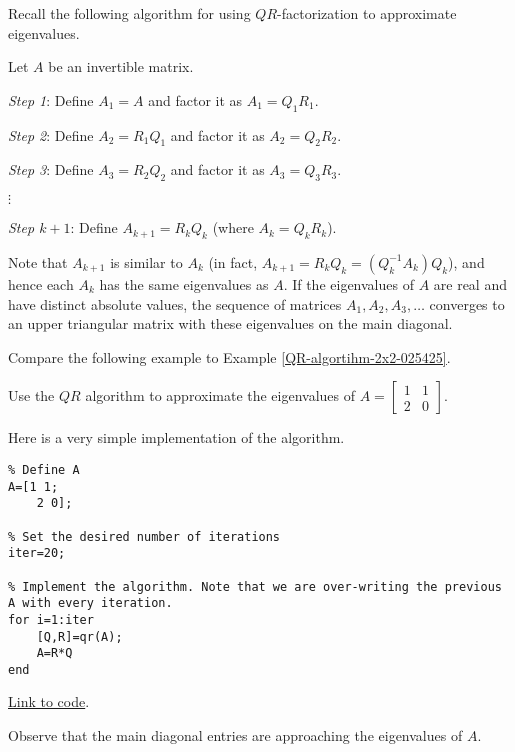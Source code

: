\documentclass{ximera}
\begin{document}
Recall the following algorithm for using $QR$-factorization to approximate eigenvalues.

\begin{algorithm}[\ref{alg:qrEig}]
Let $A$ be an invertible matrix.

\emph{Step 1}: Define $A_{1} = A$ and factor it as $A_{1} = Q_{1}R_{1}$.

\emph{Step 2}: Define $A_{2} = R_{1}Q_{1}$ and factor it as $A_{2} = Q_{2}R_{2}$.

\emph{Step 3}: Define $A_{3} = R_{2}Q_{2}$ and factor it as $A_{3} = Q_{3}R_{3}$.

 $\vdots$
 
\emph{Step $k+1$}: Define $A_{k + 1} = R_{k}Q_{k}$ (where $A_{k} = Q_{k}R_{k}$). 

Note that $A_{k + 1}$ is similar to $A_{k}$ (in fact, $A_{k+1} = R_{k}Q_{k} = (Q_{k}^{-1}A_{k})Q_{k}$), and hence each $A_{k}$ has the same eigenvalues as $A$. If the eigenvalues of $A$ are real and have distinct absolute values, the sequence of matrices $A_{1}, A_{2}, A_{3}, \dots$ converges to an upper triangular matrix with these eigenvalues on the main diagonal. 
\end{algorithm}

Compare the following example to Example \ref{QR-algortihm-2x2-025425}.

\begin{example}\label{ex:qrEig}
Use the $QR$ algorithm to approximate the eigenvalues of $A=\begin{bmatrix}1 & 1\\2 & 0\end{bmatrix}$.  

\begin{explanation}
    Here is a very simple implementation of the algorithm.  

    \begin{verbatim}
% Define A
A=[1 1;
    2 0];

% Set the desired number of iterations
iter=20;  

% Implement the algorithm. Note that we are over-writing the previous A with every iteration.
for i=1:iter
    [Q,R]=qr(A);
    A=R*Q
end    
    \end{verbatim}

\href{https://sagecell.sagemath.org/?z=eJwtjbEKwkAQRPuF_YdpAioWuZSGKw78gcQypFBuD7fwDjfn_5tDp3oMvJkOV0maBYEp-MXBjUzYM6Bfd2TqcJOK-hRE2dQkIn9eDzGUBK1i96olb0yN_dCPQLNSMah3l9b-BpfpPK_-bYdw_F8EP58mJsnxCzFCIso=&lang=octave&interacts=eJyLjgUAARUAuQ==}{Link to code}.   

Observe that the main diagonal entries are approaching the eigenvalues of $A$.
\end{explanation}
    
\end{example}
\end{document}
